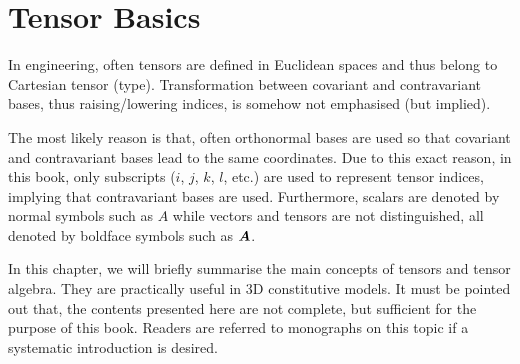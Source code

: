 \chapter{Tensor Basics}\label{chap:tensor}
In engineering, often tensors are defined in Euclidean spaces and thus belong to Cartesian tensor (type).
Transformation between covariant and contravariant bases, thus raising/lowering indices, is somehow not emphasised (but implied).

The most likely reason is that, often orthonormal bases are used so that covariant and contravariant bases lead to the same coordinates.
Due to this exact reason, in this book, only subscripts ($i$, $j$, $k$, $l$, etc.) are used to represent tensor indices, implying that contravariant bases are used. Furthermore, scalars are denoted by normal symbols such as $A$ while vectors and tensors are not distinguished, all denoted by boldface symbols such as $\bm{A}$.

In this chapter, we will briefly summarise the main concepts of tensors and tensor algebra.
They are practically useful in 3D constitutive models.
It must be pointed out that, the contents presented here are not complete, but sufficient for the purpose of this book.
Readers are referred to monographs on this topic if a systematic introduction is desired.
